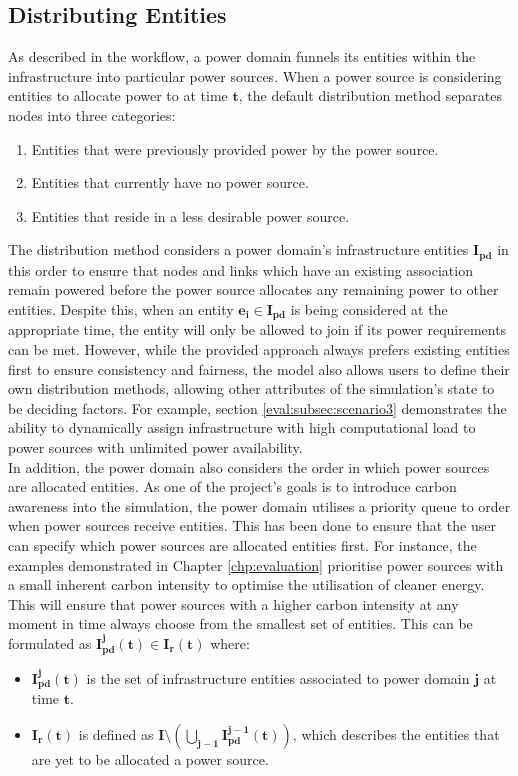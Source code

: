 \documentclass{l4proj}
\begin{document}
\subsection{Distributing Entities}\label{subsec:distributing-entities}
As described in the workflow, a power domain funnels its entities within the infrastructure into particular power sources.
When a power source is considering entities to allocate power to at time $\mathbf{t}$, the default distribution method separates nodes into three categories:
\begin{enumerate}
    \item Entities that were previously provided power by the power source.
    \item Entities that currently have no power source.
    \item Entities that reside in a less desirable power source.
\end{enumerate}

The distribution method considers a power domain's infrastructure entities $\mathbf{I_{pd}}$ in this order to ensure that nodes and links which have an existing association remain powered before the power source allocates any remaining power to other entities.
Despite this, when an entity $\mathbf{e_{i} \in I_{pd}}$ is being considered at the appropriate time, the entity will only be allowed to join if its power requirements can be met.
However, while the provided approach always prefers existing entities first to ensure consistency and fairness, the model also allows users to define their own distribution methods, allowing other attributes of the simulation's state to be deciding factors.
For example, section \ref{eval:subsec:scenario3} demonstrates the ability to dynamically assign infrastructure with high computational load to power sources with unlimited power availability.\\

In addition, the power domain also considers the order in which power sources are allocated entities.
As one of the project's goals is to introduce carbon awareness into the simulation, the power domain utilises a priority queue to order when power sources receive entities.
This has been done to ensure that the user can specify which power sources are allocated entities first.
For instance, the examples demonstrated in Chapter \ref{chp:evaluation} prioritise power sources with a small inherent carbon intensity to optimise the utilisation of cleaner energy.
This will ensure that power sources with a higher carbon intensity at any moment in time always choose from the smallest set of entities.
This can be formulated as $\mathbf{I_{pd}^j(t) \in I_{r}(t)}$ where:
\begin{itemize}
    \item $\mathbf{I_{pd}^j(t)}$ is the set of infrastructure entities associated to power domain $\mathbf{j}$ at time $\mathbf{t}$.\\
    \item $\mathbf{I_{r}(t)}$ is defined as $\mathbf{I \setminus \left( \bigcup_{j-1} I_{pd}^{j-1}(t) \right)}$, which describes the entities that are yet to be allocated a power source.
\end{itemize}
\end{document}
